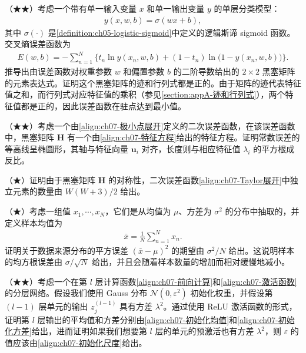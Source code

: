 \documentclass[../../main.tex]{subfiles}
\begin{document}
\begin{exercise}\label{exercise:ch07-05}
（★★）考虑一个带有单一输入变量 $x$ 和单一输出变量 $y$ 的单层分类模型：
\begin{align}
y(x,w,b) = \sigma(wx+b),
\label{align:ch07-习题分类模型}
\end{align}
其中 $\sigma(\cdot)$ 是\cref{definition:ch05-logistic-sigmoid}中定义的逻辑斯谛 sigmoid 函数。交叉熵误差函数为
\begin{align}
E(w,b) = -\sum_{n=1}^{N}\bigl\{t_n\ln y(x_n,w,b)+(1-t_n)\ln\bigl(1-y(x_n,w,b)\bigr)\bigr\}.
\label{align:ch07-习题交叉熵}
\end{align}
推导出由误差函数对权重参数 $w$ 和偏置参数 $b$ 的二阶导数给出的 $2\times2$ 黑塞矩阵的元素表达式。证明这个黑塞矩阵的迹和行列式都是正的。由于矩阵的迹代表特征值之和，而行列式对应特征值的乘积（参见\cref{section:appA-迹和行列式}），两个特征值都是正的，因此误差函数在驻点达到最小值。
\end{exercise}

\begin{exercise}\label{exercise:ch07-06}
（★★）考虑一个由\eqref{align:ch07-极小点展开}定义的二次误差函数，在该误差函数中，黑塞矩阵 $\mathbf{H}$ 有一个由\eqref{align:ch07-特征方程}给出的特征方程。证明常数误差的等高线呈椭圆形，其轴与特征向量 $\mathbf{u}_i$ 对齐，长度则与相应特征值 $\lambda_i$ 的平方根成反比。
\end{exercise}

\begin{exercise}\label{exercise:ch07-07}
（★）证明由于黑塞矩阵 $\mathbf{H}$ 的对称性，二次误差函数\eqref{align:ch07-Taylor展开}中独立元素的数量由 $W(W+3)/2$ 给出。
\end{exercise}

\begin{exercise}\label{exercise:ch07-08}
（★）考虑一组值 $x_1,\cdots,x_N$，它们是从均值为 $\mu$、方差为 $\sigma^{2}$ 的分布中抽取的，并定义样本均值为
\begin{align}
\bar{x} = \frac{1}{N}\sum_{n=1}^{N}x_n.
\label{align:ch07-习题样本均值}
\end{align}
证明关于数据来源分布的平方误差 $(\bar{x}-\mu)^{2}$ 的期望由 $\sigma^{2}/N$ 给出。这说明样本的均方根误差由 $\sigma/\sqrt{N}$ 给出，并且会随着样本数量的增加而相对缓慢地减小。
\end{exercise}

\begin{exercise}\label{exercise:ch07-09}
（★★）考虑一个在第 $l$ 层计算函数\eqref{align:ch07-前向计算}和\eqref{align:ch07-激活函数}的分层网络。假设我们使用 Gauss 分布 $\mathcal{N}(0,\varepsilon^{2})$ 初始化权重，并假设第 $(l-1)$ 层单元的输出 $z_j^{(l-1)}$ 具有方差 $\lambda^{2}$。通过使用 ReLU 激活函数的形式，证明第 $l$ 层输出的平均值和方差分别由\eqref{align:ch07-初始化均值}和\eqref{align:ch07-初始化方差}给出，进而证明如果我们想要第 $l$ 层的单元的预激活也有方差 $\lambda^{2}$，则 $\varepsilon$ 的值应该由\eqref{align:ch07-初始化尺度}给出。
\end{exercise}
\end{document}
